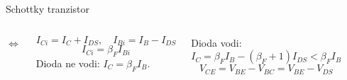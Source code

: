 \begin{frame}[label=10-s070]{Schottky tranzistor}
\setlength{\abovedisplayskip}{4pt}\setlength{\belowdisplayskip}{4pt}\setlength{\abovedisplayshortskip}{3pt}\setlength{\belowdisplayshortskip}{3pt}
\begin{columns}[T,onlytextwidth]\quad$\Longleftrightarrow$\quad\par\medskip{}\medskip{}\centering \raggedright
\[I_{Ci}=I_C+I_{DS},\quad I_{Bi}=I_B-I_{DS}\]
\[I_{Ci}=\beta_FI_{Bi}\]
Dioda ne vodi: $I_C=\beta_FI_B$.\par\medskip
Dioda vodi:
\[I_C=\beta_FI_B-(\beta_F+1)I_{DS}<\beta_FI_B\]
\[V_{CE}=V_{BE}-V_{BC}=V_{BE}-V_{DS}\]
\end{columns}
\end{frame}
